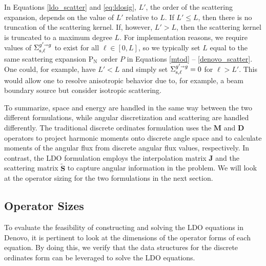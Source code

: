 \documentclass{article} %
\newcommand{\sa}{\shortrightarrow}
\newcommand{\pn}{P$_\mathrm{N}$}
\newcommand{\ve}[1]{\ensuremath{\mathbf{#1}}}
\newcommand{\Sigg}[1]{\ensuremath{\Sigma^{g'\sa g}_{\text{s},#1}}}
\begin{document}
In Equations \eqref{ldo_scatter} and \eqref{eq:ldosig}, $L'$, the order of the
scattering expansion, depends on the value of $L'$ relative to $L$. If 
$L'\le L$, then there is no truncation of the scattering kernel. If, however,
$L' > L$, then the scattering kernel is truncated to a maximum degree $L$. For
implementation reasons, we require values of $\Sigg{\ell}$ to exist for all
$\ell \in [0,L]$, so we typically set $L$ equal to the same scattering
expansion \pn\ order $P$ in Equations \eqref{mtod} -- \eqref{denovo_scatter}. One
could, for example, have $L' < L$ and simply set $\Sigg{\ell}=0$ for $\ell> L'$.
This would allow one to resolve anisotropic behavior due to, for example,
a beam boundary source but consider isotropic scattering.

To summarize, space and energy are handled in the same way between the two
different formulations, while angular discretization and scattering are handled
differently. The traditional discrete ordinates formulation uses the $\ve{M}$
and $\ve{D}$ operators to project harmonic moments onto discrete angle space
and to calculate moments of the angular flux from discrete angular flux values,
respectively. In contrast, the LDO formulation employs the interpolation matrix
$\ve{J}$ and the scattering matrix $\ve{\tilde{S}}$ to capture angular
information in the problem. We will look at the
operator sizing for the two formulations in the next section.

\subsection{Operator Sizes}
\label{sec:op}

To evaluate the feasibility of constructing and solving the LDO equations in
Denovo, it is pertinent to look at the dimensions of the operator forms of each
equation. By doing this, we verify that the data structures for the discrete
ordinates form can be leveraged to solve the LDO equations.
\end{document}
